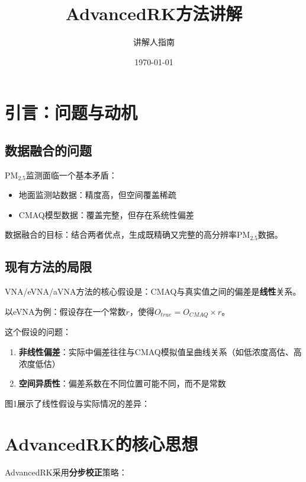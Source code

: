 \documentclass[UTF8, a4paper, 12pt]{article}
\title{AdvancedRK方法讲解}
\author{讲解人指南}
\date{\today}
\begin{document}
\maketitle

\section{引言：问题与动机}

\subsection{数据融合的问题}

PM$_{2.5}$监测面临一个基本矛盾：
\begin{itemize}
    \item 地面监测站数据：精度高，但空间覆盖稀疏
    \item CMAQ模型数据：覆盖完整，但存在系统性偏差
\end{itemize}

数据融合的目标：结合两者优点，生成既精确又完整的高分辨率PM$_{2.5}$数据。

\subsection{现有方法的局限}

VNA/eVNA/aVNA方法的核心假设是：CMAQ与真实值之间的偏差是\textbf{线性}关系。

以eVNA为例：假设存在一个常数$r$，使得$O_{true} = O_{CMAQ} \times r$。

这个假设的问题：
\begin{enumerate}
    \item \textbf{非线性偏差}：实际中偏差往往与CMAQ模拟值呈曲线关系（如低浓度高估、高浓度低估）
    \item \textbf{空间异质性}：偏差系数在不同位置可能不同，而不是常数
\end{enumerate}

图1展示了线性假设与实际情况的差异：

\begin{figure}[htbp]
\centering
{}
\end{figure}

\section{AdvancedRK的核心思想}

AdvancedRK采用\textbf{分步校正}策略：
\end{document}
